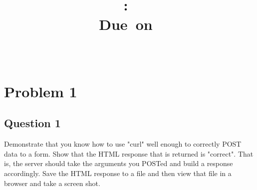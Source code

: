 \documentclass[10pt,letterpaper]{article}
\title{
\vspace{2in}
\textmd{\textbf{\hmwkClass:\ \hmwkTitle}}\\
\normalsize\vspace{0.1in}\small{Due\ on\ \hmwkDueDate}\\
\vspace{0.1in}\large{\textit{\hmwkClassInstructor\ \hmwkClassTime}}
\vspace{3in}
}
\author{\textbf{\hmwkAuthorName}}
\begin{document}
\maketitle


\pagebreak
\tableofcontents
\pagebreak 





\section{Problem 1}
\subsection{Question 1}
Demonstrate that you know how to use "curl" well enough to correctly POST data to a form.  Show that the HTML response that is returned is "correct".  That is, the server should take the arguments you POSTed and build a response accordingly.  Save the HTML response to a file and then view that file in a browser and take a screen shot.
\end{document}
